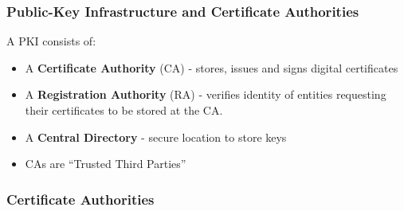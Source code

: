 \documentclass[
hyperref={pdfpagelabels=false}
,xcolor=table
]
{beamer}
\begin{document}
\begin{frame}
  \frametitle{Public-Key Infrastructure and Certificate Authorities}
  A PKI consists of: 
  \begin{itemize}
  \item A \textbf{Certificate Authority} (CA) - stores, issues and signs digital certificates
  \item A \textbf{Registration Authority} (RA) - verifies identity of entities requesting their certificates to be stored at the CA. 
  \item A \textbf{Central Directory} - secure location to store keys 
  \end{itemize}

  \begin{itemize}
  \item CAs are ``Trusted Third Parties''
  \end{itemize}
\end{frame}


\begin{frame}
  \frametitle{Certificate Authorities}
  \begin{center}
  \end{center}
\end{frame}
\end{document}
